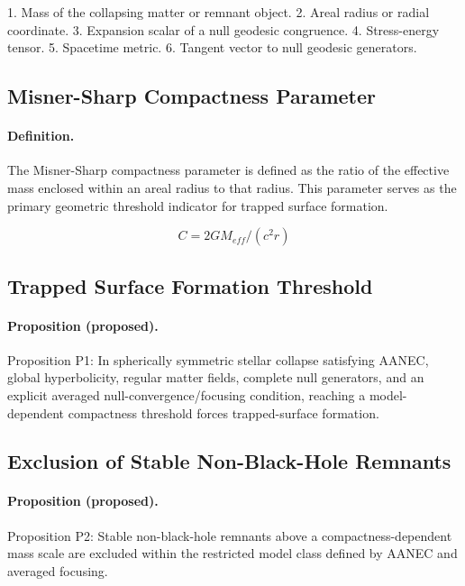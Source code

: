 \documentclass[conference]{IEEEtran}
\begin{document}
1. Mass of the collapsing matter or remnant object. 2. Areal radius or radial coordinate. 3. Expansion scalar of a null geodesic congruence. 4. Stress-energy tensor. 5. Spacetime metric. 6. Tangent vector to null geodesic generators.

\subsection{Misner-Sharp Compactness Parameter}
\paragraph{Definition.} The Misner-Sharp compactness parameter is defined as the ratio of the effective mass enclosed within an areal radius to that radius. This parameter serves as the primary geometric threshold indicator for trapped surface formation.

\begin{equation}
C = 2G M_{eff} / (c^2 r)
\label{eq:definitions-and-propositions-eq-compactness}
\end{equation}

\subsection{Trapped Surface Formation Threshold}
\paragraph{Proposition (proposed).} Proposition P1: In spherically symmetric stellar collapse satisfying AANEC, global hyperbolicity, regular matter fields, complete null generators, and an explicit averaged null-convergence/focusing condition, reaching a model-dependent compactness threshold forces trapped-surface formation.

\subsection{Exclusion of Stable Non-Black-Hole Remnants}
\paragraph{Proposition (proposed).} Proposition P2: Stable non-black-hole remnants above a compactness-dependent mass scale are excluded within the restricted model class defined by AANEC and averaged focusing.
\end{document}
